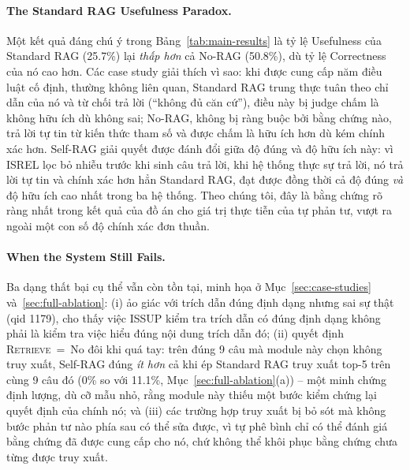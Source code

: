 \documentclass[11pt]{article}
\begin{document}
\paragraph{The Standard RAG Usefulness Paradox.} Một kết quả đáng chú ý trong Bảng~\ref{tab:main-results} là tỷ lệ Usefulness của Standard RAG (25.7\%) lại \emph{thấp hơn} cả No-RAG (50.8\%), dù tỷ lệ Correctness của nó cao hơn. Các case study giải thích vì sao: khi được cung cấp năm điều luật cố định, thường không liên quan, Standard RAG trung thực tuân theo chỉ dẫn của nó và từ chối trả lời (``không đủ căn cứ''), điều này bị judge chấm là không hữu ích dù không sai; No-RAG, không bị ràng buộc bởi bằng chứng nào, trả lời tự tin từ kiến thức tham số và được chấm là hữu ích hơn dù kém chính xác hơn. Self-RAG giải quyết được đánh đổi giữa độ đúng và độ hữu ích này: vì \textsc{ISREL} lọc bỏ nhiễu trước khi sinh câu trả lời, khi hệ thống thực sự trả lời, nó trả lời tự tin và chính xác hơn hẳn Standard RAG, đạt được đồng thời cả độ đúng \emph{và} độ hữu ích cao nhất trong ba hệ thống. Theo chúng tôi, đây là bằng chứng rõ ràng nhất trong kết quả của đồ án cho giá trị thực tiễn của tự phản tư, vượt ra ngoài một con số độ chính xác đơn thuần.

\paragraph{When the System Still Fails.} Ba dạng thất bại cụ thể vẫn còn tồn tại, minh họa ở Mục~\ref{sec:case-studies} và~\ref{sec:full-ablation}: (i) ảo giác với trích dẫn đúng định dạng nhưng sai sự thật (qid 1179), cho thấy việc \textsc{ISSUP} kiểm tra trích dẫn có đúng định dạng không phải là kiểm tra việc hiểu đúng nội dung trích dẫn đó; (ii) quyết định \textsc{Retrieve}~=~No đôi khi quá tay: trên đúng 9 câu mà module này chọn không truy xuất, Self-RAG đúng \emph{ít hơn} cả khi ép Standard RAG truy xuất top-5 trên cùng 9 câu đó (0\% so với 11.1\%, Mục~\ref{sec:full-ablation}(a)) -- một minh chứng định lượng, dù cỡ mẫu nhỏ, rằng module này thiếu một bước kiểm chứng lại quyết định của chính nó; và (iii) các trường hợp truy xuất bị bỏ sót mà không bước phản tư nào phía sau có thể sửa được, vì tự phê bình chỉ có thể đánh giá bằng chứng đã được cung cấp cho nó, chứ không thể khôi phục bằng chứng chưa từng được truy xuất.
\end{document}
